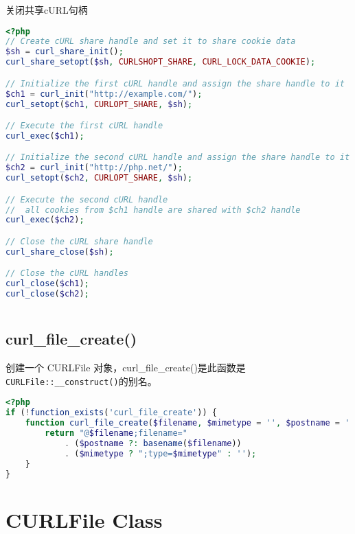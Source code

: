 \begin{example}
关闭共享cURL句柄
\begin{lstlisting}[language=PHP]
<?php
// Create cURL share handle and set it to share cookie data
$sh = curl_share_init();
curl_share_setopt($sh, CURLSHOPT_SHARE, CURL_LOCK_DATA_COOKIE);

// Initialize the first cURL handle and assign the share handle to it
$ch1 = curl_init("http://example.com/");
curl_setopt($ch1, CURLOPT_SHARE, $sh);

// Execute the first cURL handle
curl_exec($ch1);

// Initialize the second cURL handle and assign the share handle to it
$ch2 = curl_init("http://php.net/");
curl_setopt($ch2, CURLOPT_SHARE, $sh);

// Execute the second cURL handle
//  all cookies from $ch1 handle are shared with $ch2 handle
curl_exec($ch2);

// Close the cURL share handle
curl_share_close($sh);

// Close the cURL handles
curl_close($ch1);
curl_close($ch2);
\end{lstlisting}
\end{example}







\begin{lstlisting}[language=PHP]

\end{lstlisting}


\section{curl\_file\_create()}

创建一个 CURLFile 对象，curl\_file\_create()是此函数是\texttt{CURLFile::\_\_construct()}的别名。




\begin{lstlisting}[language=PHP]
<?php
if (!function_exists('curl_file_create')) {
    function curl_file_create($filename, $mimetype = '', $postname = '') {
        return "@$filename;filename="
            . ($postname ?: basename($filename))
            . ($mimetype ? ";type=$mimetype" : '');
    }
}
\end{lstlisting}


\chapter{CURLFile Class}


